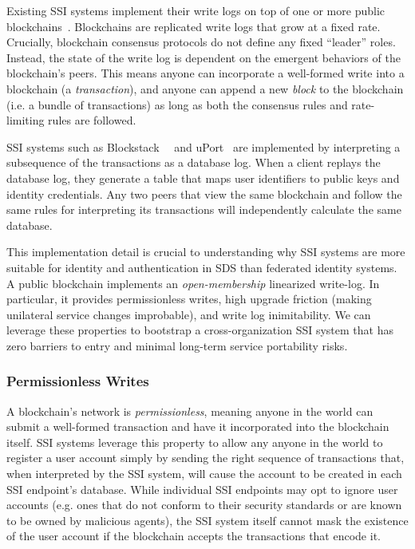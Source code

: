 Existing SSI systems implement their write logs on top of one or more public
blockchains~\cite{bitcoin}.  Blockchains are replicated write logs that
grow at a fixed rate.  Crucially, blockchain consensus protocols do not 
define any fixed ``leader'' roles.  Instead, the state of the write log is dependent on the emergent behaviors
of the blockchain's peers.  This means anyone can incorporate a well-formed write into a blockchain
(a \emph{transaction}), and anyone can append a new \emph{block} to the
blockchain (i.e. a bundle of transactions)
as long as both the consensus rules and rate-limiting rules are followed.

SSI systems such as Blockstack~\cite{blockstack}~\cite{blockstack-thesis} and
uPort~\cite{uport} are implemented by interpreting a subsequence of the
transactions as a database log.  When a client replays the database log, they
generate a table that maps user identifiers to public keys and identity
credentials.  Any two peers that view the same blockchain and follow the
same rules for interpreting its transactions will independently
calculate the same database.

This implementation detail is crucial to understanding why SSI systems are
more suitable for identity and authentication in SDS than federated identity
systems.  A public blockchain implements an \emph{open-membership} linearized
write-log.  In particular, it provides permissionless
writes, high upgrade friction (making unilateral service changes improbable),
and write log inimitability.  We can leverage these properties to bootstrap a
cross-organization SSI system that has zero barriers to entry and minimal
long-term service portability risks.

\subsubsection{Permissionless Writes}

A blockchain's network is \emph{permissionless}, meaning anyone in the world can submit a
well-formed transaction and have it incorporated into the blockchain itself.
SSI systems leverage this property to allow any anyone in the world to register a user account
simply by sending the right sequence of transactions that, when interpreted by the SSI system, will
cause the account to be created in each SSI endpoint's database.
While individual SSI endpoints may opt to ignore user accounts (e.g. ones that do not conform to their security
standards or are known to be owned by malicious agents), the SSI system itself cannot
mask the existence of the user account if the blockchain accepts the
transactions that encode it.

